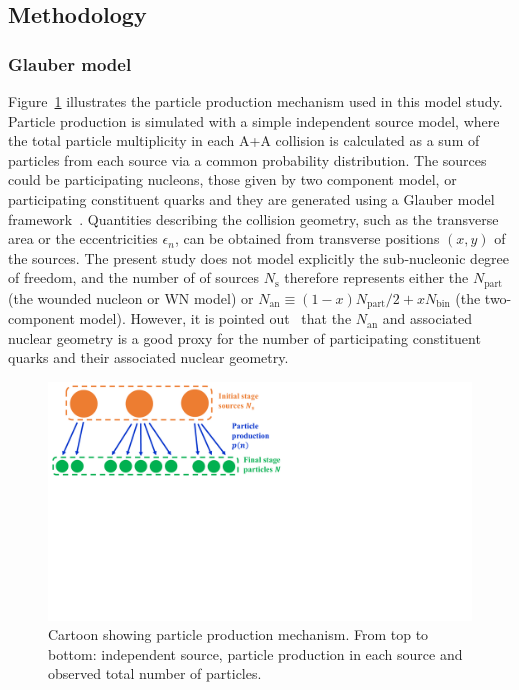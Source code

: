 \subsection{Methodology}

\subsubsection{Glauber model}
\label{sec:glauber_model}

Figure~\ref{fig:centfluc_cartoon_particle_production} illustrates the particle production mechanism used in this model study. Particle production is simulated with a simple independent source model, where the total particle multiplicity in each A+A collision is calculated as a sum of particles from each source via a common probability distribution. The sources could be participating nucleons, those given by two component model, or participating constituent quarks and they are generated using a Glauber model framework~\cite{Miller:2007ri}. Quantities describing the collision geometry, such as the transverse area or the eccentricities $\epsilon_n$, can be obtained from transverse positions $(x, y)$ of the sources. The present study does not model explicitly the sub-nucleonic degree of freedom, and the number of of sources $N_\text{s}$ therefore represents either the $N_\text{part}$ (the wounded nucleon or WN model) or $N_\text{an}\equiv (1-x) N_\text{part}/2 + x N_\text{bin}$ (the two-component model). However, it is pointed out~\cite{Adler:2013aqf} that the $N_\text{an}$ and associated nuclear geometry is a good proxy for the number of participating constituent quarks and their associated nuclear geometry.

\begin{figure}[H]
\centering
\includegraphics[width=.75\linewidth]{figs/chapter_centfluc/cartoon_particle_production.pdf}
\caption{Cartoon showing particle production mechanism. From top to bottom: independent source, particle production in each source and observed total number of particles.}
\label{fig:centfluc_cartoon_particle_production}
\end{figure}

